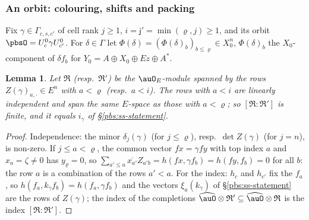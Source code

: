 \documentclass[10pt]{amsart}
\newtheorem{lemma}[theorem]{Lemma}
\theoremstyle{definition}
\theoremstyle{remark}
\providecommand{\aubar}[1]{\overline{#1}}
\begin{document}
\subsubsection{An orbit: colouring, shifts and packing}\label{pbs:ss-orbit}

Fix $\gamma\in\Gamma_{c,s,c'}$ of cell rank $j\ge1$, $i=\mathsf j'=\min(\varrho,j)\ge1$, and its orbit
$\pbsO=U^0_c\gamma U^0_{c'}$. For $\delta\in\Gamma$ let $\Phi(\delta)=(\Phi(\delta)_b)_{b\le\varrho}\in
X_0^n$, $\Phi(\delta)_b$ the $X_0$-component of $\delta f_b$ for $Y_0=A\oplus X_0\oplus Ez\oplus A^*$.

\begin{lemma}\label{pbs:indep}
Let $\mathfrak R$ (resp.\ $\mathfrak R'$) be the $\auO_E$-module spanned by the rows $Z(\gamma)_{a,\cdot}
\in E^n$ with $a<\varrho$ (resp.\ $a<i$). The rows with $a<i$ are linearly independent and span the
same $E$-space as those with $a<\varrho$; so $[\mathfrak R:\mathfrak R']$ is finite, and it equals
$i_\gamma$ of \S\ref{pbs:ss-statement}.
\end{lemma}
\begin{proof}
Independence: the minor $\delta_j(\gamma)$ (for $j\le\varrho$), resp.\ $\det Z(\gamma)$ (for $j=n$), is
non-zero. If $j\le a<\varrho$, the common vector $fx=\gamma fy$ with top index $a$ and $x_a=\zeta\ne0$
has $y_\varrho=0$, so $\sum_{a'\le a}\aubar{x_{a'}}Z_{a'b}=h(fx,\gamma f_b)=h(fy,f_b)=0$ for all $b$:
the row $a$ is a combination of the rows $a'<a$. For the index: $h_c$ and $h_{c'}$ fix the $f_a$, so
$h(f_a,k_\gamma f_b)=h(f_a,\gamma f_b)$ and the vectors $\xi_a(k_\gamma)$ of \S\ref{pbs:ss-statement}
are the rows of $Z(\gamma)$; the index of the completions $\widehat\auO\otimes\mathfrak R'\subseteq
\widehat\auO\otimes\mathfrak R$ is the index $[\mathfrak R:\mathfrak R']$.
\end{proof}
\end{document}

